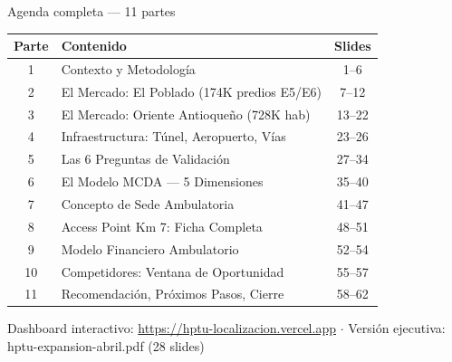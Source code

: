 \documentclass[aspectratio=169, 11pt]{beamer}
\begin{document}
\begin{frame}{Agenda completa --- 11 partes}
\vspace{-2pt}
\begin{center}
{\scriptsize
\begin{tabular}{@{}clc@{}}
\toprule
\textbf{Parte} & \textbf{Contenido} & \textbf{Slides} \\
\midrule
\rowcolor{hptu!5}
1 & Contexto y Metodología & 1--6 \\
2 & El Mercado: El Poblado (174K predios E5/E6) & 7--12 \\
\rowcolor{hptu!5}
3 & El Mercado: Oriente Antioqueño (728K hab) & 13--22 \\
4 & Infraestructura: Túnel, Aeropuerto, Vías & 23--26 \\
\rowcolor{hptu!5}
5 & Las 6 Preguntas de Validación & 27--34 \\
6 & El Modelo MCDA --- 5 Dimensiones & 35--40 \\
\rowcolor{rose!5}
7 & Concepto de Sede Ambulatoria & 41--47 \\
8 & Access Point Km 7: Ficha Completa & 48--51 \\
\rowcolor{rose!5}
9 & Modelo Financiero Ambulatorio & 52--54 \\
10 & Competidores: Ventana de Oportunidad & 55--57 \\
\rowcolor{teal!5}
11 & Recomendación, Próximos Pasos, Cierre & 58--62 \\
\bottomrule
\end{tabular}
}
\end{center}
\vspace{4pt}
{\footnotesize\textcolor{slate}{Dashboard interactivo: \url{https://hptu-localizacion.vercel.app} $\cdot$ Versión ejecutiva: hptu-expansion-abril.pdf (28 slides)}}
\end{frame}
\end{document}
